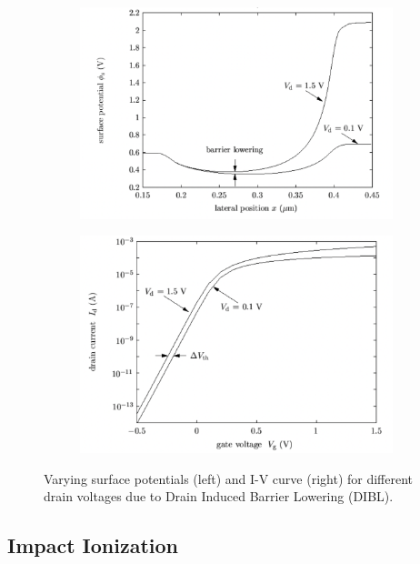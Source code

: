 \begin{figure}
\centering
\begin{subfigure}{.5\textwidth}
  \centering
  \includegraphics[width=\linewidth]{../../Figures/dibl1.png}
    \label{fig:dibl1}
\end{subfigure}%
\begin{subfigure}{.5\textwidth}
  \centering
  \includegraphics[width=\linewidth]{../../Figures/dibl2.png}
    \label{fig:dibl2}
\end{subfigure}
\caption{Varying surface potentials (left) and I-V curve (right) for different drain voltages due to Drain Induced Barrier Lowering (DIBL).}
\end{figure}

\subsection{Impact Ionization}

